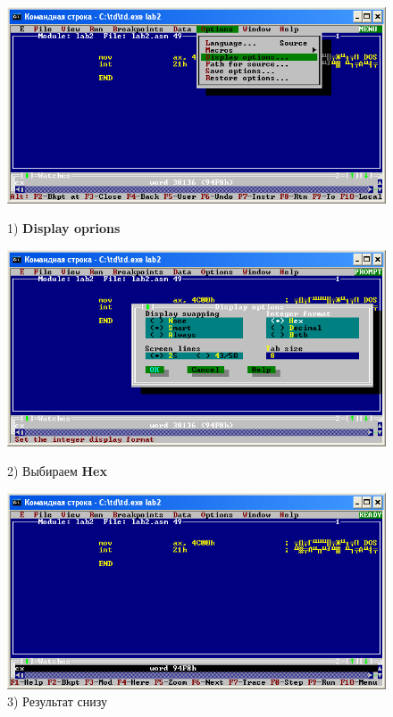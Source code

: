 \begin{figure}[!htp]
    \centering
    \begin{minipage}{0.32\textwidth}
        \centering
        \includegraphics[width=.99\linewidth]
            {../_INCLUDES/task-4-13-1/1.png}
        \caption{1) \textbf{Display oprions}}
        \label{fig:task_4_13_1__1}
    \end{minipage}
    \begin {minipage}{0.32\textwidth}
        \centering
        \includegraphics[width=.99\linewidth]
            {../_INCLUDES/task-4-13-1/2.png}
        \caption{2) Выбираем \textbf{Hex}}
        \label{fig:task_4_13_1__2}
    \end{minipage}
    \begin {minipage}{0.32\textwidth}
        \centering
        \includegraphics[width=.99\linewidth]
            {../_INCLUDES/task-4-13-1/3.png}
        \caption{3) Результат снизу}
        \label{fig:task_4_13_1__3}
    \end{minipage}
\end{figure}
